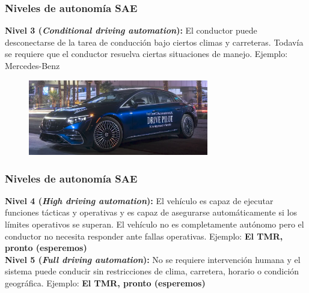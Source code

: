 \begin{frame}\frametitle{Niveles de autonomía SAE}
  \textbf{Nivel 3 (\textit{Conditional driving automation}):} El conductor puede desconectarse de la tarea de conducción bajo ciertos climas y carreteras. Todavía se requiere que el conductor resuelva ciertas situaciones de manejo. Ejemplo: Mercedes-Benz
  \begin{figure}
    \centering
    \includegraphics[width=0.7\textwidth]{Figuras/EjemploSAE3.png}
  \end{figure}
\end{frame}

\begin{frame}\frametitle{Niveles de autonomía SAE}
  \textbf{Nivel 4 (\textit{High driving automation}):} El vehículo es capaz de ejecutar funciones tácticas y operativas y es capaz de asegurarse automáticamente si los límites operativos se superan. El vehículo no es completamente autónomo pero el conductor no necesita responder ante fallas operativas. Ejemplo: \textbf{El TMR, pronto (esperemos)}
  \[\]
  \textbf{Nivel 5 (\textit{Full driving automation}):} No se requiere intervención humana y el sistema puede conducir sin restricciones de clima, carretera, horario o condición geográfica.  Ejemplo: \textbf{El TMR, pronto (esperemos)}
\end{frame}
